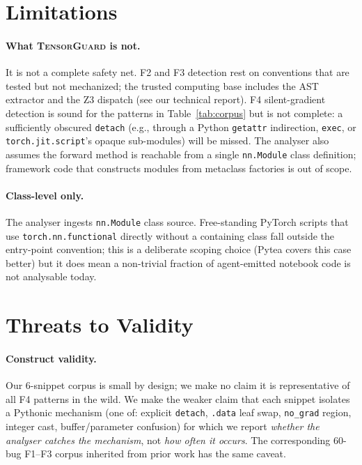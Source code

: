 \documentclass{article}
\begin{document}
\section{Limitations}
\label{sec:limits}

\paragraph{What \textsc{TensorGuard} is not.} It is not a complete safety net.
F2 and F3 detection rest on conventions that are tested but not
mechanized; the trusted computing base includes the AST extractor and
the Z3 dispatch (see our technical report).
F4 silent-gradient detection is sound for the patterns in
Table~\ref{tab:corpus} but is not complete: a sufficiently obscured
\texttt{detach} (e.g., through a Python \texttt{getattr} indirection,
\texttt{exec}, or \texttt{torch.jit.script}'s opaque
sub-modules) will be missed. The analyser also assumes the
forward method is reachable from a single \texttt{nn.Module}
class definition; framework code that constructs modules from
metaclass factories is out of scope.

\paragraph{Class-level only.} The analyser ingests
\texttt{nn.Module} class source. Free-standing PyTorch scripts
that use \texttt{torch.nn.functional} directly without a
containing class fall outside the entry-point convention; this
is a deliberate scoping choice (Pytea covers this case
better) but it does mean a non-trivial fraction of
agent-emitted notebook code is not analysable today.

\section{Threats to Validity}
\label{sec:threats}

\paragraph{Construct validity.} Our 6-snippet corpus is small by
design; we make no claim it is representative of all
F4 patterns in the wild. We make the weaker claim that
each snippet isolates a Pythonic mechanism (one of: explicit
\texttt{detach}, \texttt{.data} leaf swap, \texttt{no\_grad}
region, integer cast, buffer/parameter confusion) for which we
report \emph{whether the analyser catches the mechanism}, not
\emph{how often it occurs}. The corresponding 60-bug F1--F3
corpus inherited from prior work has the same caveat.
\end{document}
